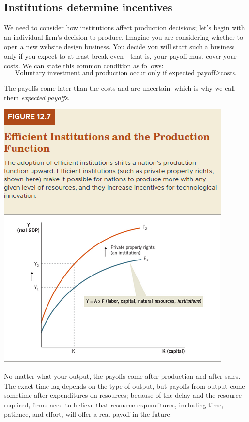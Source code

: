 \documentclass[11pt]{article} %
\begin{document}
\subsection*{Institutions determine incentives}
We need to consider how institutions affect production decisions; let's begin with an individual firm's decision to produce. Imagine you are considering whether to open a new website design business. You decide you will start such a business only if you expect to at least break even - that is, your payoff must cover your costs. We can state this common condition as follows:
\begin{equation}
\text{Voluntary investment and production occur only if expected payoff} \geq \text{costs.}
\end{equation}

The payoffs come later than the costs and are uncertain, which is why we call them \textit{expected payoffs}.
\begin{center}
\includegraphics[scale=0.5]{Images/Table 12.7.png}
\end{center}
No matter what your output, the payoffs come after production and after sales. The exact time lag depends on the type of output, but payoffs from output come sometime after expenditures on resources; because of the delay and the resource required, firms need to believe that resource expenditures, including time, patience, and effort, will offer a real payoff in the future.
\end{document}
